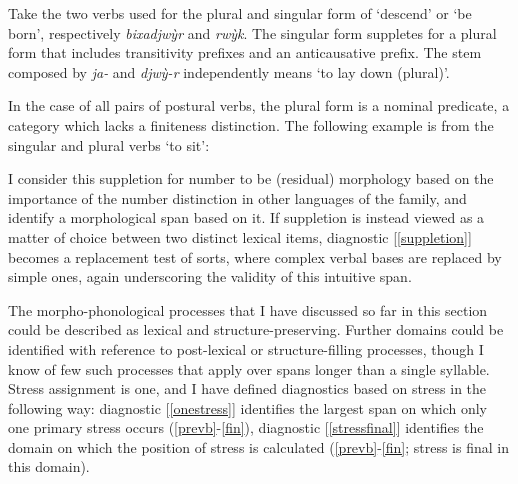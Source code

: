 \documentclass[output=paper]{langscibook}
\begin{document}
Take the two verbs used for the plural and singular form of `descend' or `be born', respectively {\em bixadjwỳr} and {\em rwỳk}. The singular form suppletes for a plural form that includes transitivity prefixes and an anticausative prefix. The stem composed by {\em ja-} and {\em djwỳ-r} independently means `to lay down (plural)'.


In the case of all pairs of postural verbs, the plural form is a nominal predicate, a category which lacks a finiteness distinction. The following example is from the singular and plural verbs `to sit':


I consider this suppletion for number to be (residual) morphology based on the importance of the number distinction in other languages of the family, and identify a morphological span based on it. If suppletion is instead viewed as a matter of choice between two distinct lexical items, diagnostic [\ref{suppletion}] becomes a replacement test of sorts, where complex verbal bases are replaced by simple ones, again underscoring the validity of this intuitive span. %


The morpho-phonological processes that I have discussed so far in this section could be described as lexical and structure-preserving. Further domains could be identified with reference to post-lexical or structure-filling processes, though I know of few such processes that apply over spans longer than a single syllable. Stress assignment is one, and I have defined diagnostics based on stress in the following way: diagnostic [\ref{onestress}] identifies the largest span on which only one primary stress occurs (\ref{prevb}-\ref{fin}), diagnostic [\ref{stressfinal}] identifies the domain on which the position of stress is calculated (\ref{prevb}-\ref{fin}; stress is final in this domain).
\end{document}
